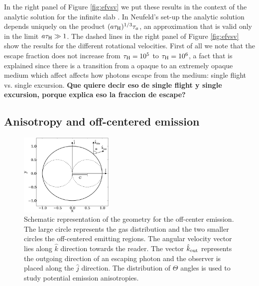 \documentclass{emulateapj}
\newcommand{\ly}{{\ifmmode{{\rm Ly}\alpha~}\else{Ly$\alpha$~}\fi}}
\begin{document}
In the right panel of Figure \ref{fig:efvsv} we put these results in the context of
the analytic solution for the infinite slab \citep{Neufeld90}. In
Neufeld's set-up the analytic solution depends uniquely on the product
$(a\tau_{\rm   H})^{1/3}\tau_{a}$, an approximation that is valid only
in the limit $a\tau_{\rm   H}\gg 1$. The dashed lines in the right panel of Figure
\ref{fig:efvsv} show the results for the different rotational
velocities. First of all we note that the escape fraction does not
increase from $\tau_{\rm H}=10^{5}$ to $\tau_{\rm H}=10^{6}$, a fact
that is explained since there is a transition from a opaque to an extremely opaque medium
which affect affects how \ly photons escape from the medium: single flight 
vs. single excursion. {\bf Que quiere decir eso de single flight y
  single excursion, porque explica eso la fraccion de escape?} 


\subsection{Anisotropy and off-centered emission}
\label{sec:off-center}

\begin{figure}
\begin{center}
  \includegraphics[width=0.40\textwidth]{f8.eps}
\end{center}
\caption{Schematic representation of the geometry for the off-center
  emission. The large circle represents the gas distribution and the
    two smaller circles the off-centered \ly emitting regions. The angular
    velocity vector lies along $\hat{k}$ direction
    towards the reader. The vector $\hat{k}_{\rm out}$ represents the
    outgoing direction of an escaping \ly photon and the observer is
    placed along the $\hat{j}$ direction. The distribution of $\Theta$
    angles is used to study potential emission anisotropies. 
    \label{fig:OCspheres}}
\end{figure}
\end{document}

